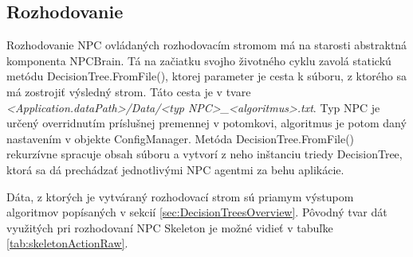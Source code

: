 \documentclass[slovak, master]{diploma}
\begin{document}
\subsection{Rozhodovanie}
\label{sec:ImplDecisionTrees}
Rozhodovanie NPC ovládaných rozhodovacím stromom má na starosti abstraktná komponenta NPCBrain. Tá na začiatku svojho životného cyklu zavolá statickú metódu DecisionTree.FromFile(), ktorej parameter je cesta k súboru, z ktorého sa má zostrojiť výsledný strom. Táto cesta je v tvare \textit{<Application.dataPath>/Data/<typ NPC>\_<algoritmus>.txt}. Typ NPC je určený overridnutím príslušnej premennej v potomkovi, algoritmus je potom daný nastavením v objekte ConfigManager. Metóda DecisionTree.FromFile() rekurzívne spracuje obsah súboru a vytvorí z neho inštanciu triedy DecisionTree, ktorá sa dá prechádzať jednotlivými NPC agentmi za behu aplikácie.

Dáta, z ktorých je vytváraný rozhodovací strom sú priamym výstupom algoritmov popísaných v sekcií \ref{sec:DecisionTreesOverview}. Pôvodný tvar dát využitých pri rozhodovaní NPC Skeleton je možné vidieť v tabuľke \ref{tab:skeletonActionRaw}.
\end{document}
